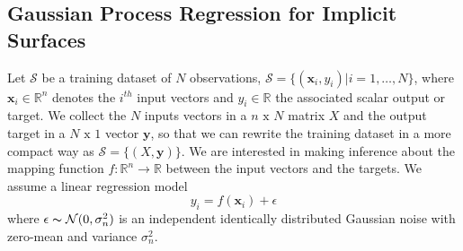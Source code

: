 %
%
%
%

\subsection{Gaussian Process Regression for Implicit Surfaces}
\label{sec:gpr}

Let $\mathcal{S}$ be a training dataset of $N$ observations, $\mathcal{S}=\{(\mathbf{x}_i, y_i)|i=1,\dots,N\}$, where $\mathbf{x}_i\in\mathbb{R}^n$ denotes the $i^{th}$ input vectors and $y_i\in\mathbb{R}$ the associated scalar output or target.  We collect the $N$ inputs vectors in a $n\text{ x }N$ matrix $X$ and the output target in a $N\text{ x }1$ vector $\mathbf{y}$, so that we can rewrite the training dataset in a more compact way as $\mathcal{S}=\{(X,\mathbf{y})\}$. We are interested in making inference about the mapping function $f:\mathbb{R}^n\rightarrow\mathbb{R}$ between the input vectors and the targets. We assume a linear regression model
$$
y_i=f(\mathbf{x}_i)+\epsilon
$$
where $\epsilon\thicksim\mathcal{N}(0,\sigma_n^2)$ is an independent identically distributed Gaussian noise with zero-mean and variance $\sigma_n^2$. 

